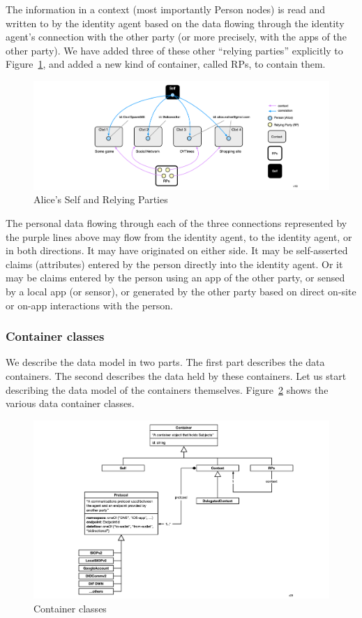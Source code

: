 \documentclass[11pt, oneside]{article}   	%
\begin{document}
The information in a context (most importantly Person nodes) is read and written to by the identity agent based on the data flowing through the identity agent's connection with the other party (or more precisely, with the apps of the other party). We have added three of these other ``relying parties'' explicitly to Figure~\ref{fig:RPs-container}, and added a new kind of container, called RPs, to contain them. 

\begin{figure}[h!]
\includegraphics[width=\textwidth]{./images/example2.png}
\caption{Alice's Self and Relying Parties}
\label{fig:RPs-container}
\end{figure}

The personal data flowing through each of the three connections represented by the purple lines above may flow from the identity agent, to the identity agent, or in both directions. It may have originated on either side. It may be self-asserted claims (attributes) entered by the person directly into the identity agent. Or it may be claims entered by the person using an app of the other party, or sensed by a local app (or sensor), or generated by the other party based on direct on-site or on-app interactions with the person.

\subsubsection{Container classes}

We describe the data model in two parts. The first part describes the data containers. The second describes the data held by these containers. Let us start describing the data model of the containers themselves. Figure~\ref{fig:containers} shows the various data container classes. 

\begin{figure}[h!]
\includegraphics[width=\textwidth]{./images/container-classes.png}
\caption{Container classes}
\label{fig:containers}
\end{figure} 
\end{document}
